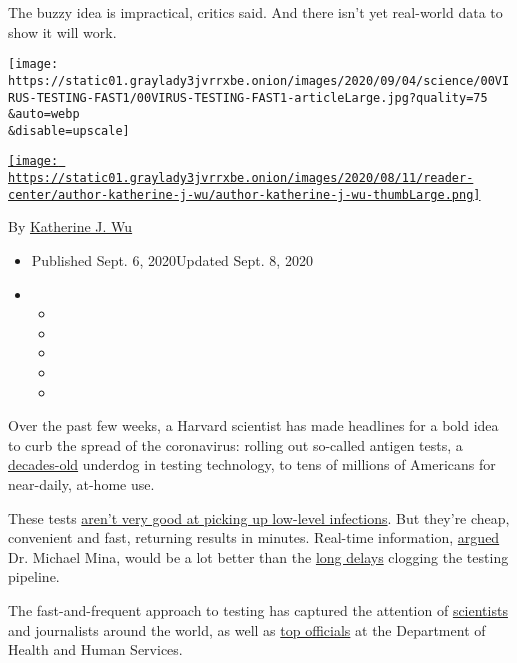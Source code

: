 The buzzy idea is impractical, critics said. And there isn't yet
real-world data to show it will work.

\texttt{[image: https://static01.graylady3jvrrxbe.onion/images/2020/09/04/science/00VIRUS-TESTING-FAST1/00VIRUS-TESTING-FAST1-articleLarge.jpg?quality=75\\\&auto=webp\\\&disable=upscale]}

\href{https://www.nytimes3xbfgragh.onion/by/katherine-j--wu}{\texttt{[image: https://static01.graylady3jvrrxbe.onion/images/2020/08/11/reader-center/author-katherine-j-wu/author-katherine-j-wu-thumbLarge.png]}}

By
\href{https://www.nytimes3xbfgragh.onion/by/katherine-j--wu}{Katherine
J. Wu}

\begin{itemize}
\item
  Published Sept. 6, 2020Updated Sept. 8, 2020
\item
  \begin{itemize}
  \item
  \item
  \item
  \item
  \item
  \end{itemize}
\end{itemize}

Over the past few weeks, a Harvard scientist has made headlines for a
bold idea to curb the spread of the coronavirus: rolling out so-called
antigen tests, a
\href{https://www.ncbi.nlm.nih.gov/pmc/articles/PMC7119943/}{decades-old}
underdog in testing technology, to tens of millions of Americans for
near-daily, at-home use.

These tests
\href{https://www.nytimes3xbfgragh.onion/2020/08/06/health/rapid-Covid-tests.html}{aren't
very good at picking up low-level infections}. But they're cheap,
convenient and fast, returning results in minutes. Real-time
information,
\href{https://www.nytimes3xbfgragh.onion/2020/07/03/opinion/coronavirus-tests.html}{argued}
Dr. Michael Mina, would be a lot better than the
\href{https://www.nytimes3xbfgragh.onion/2020/07/23/health/coronavirus-testing-supply-shortage.html}{long
delays} clogging the testing pipeline.

The fast-and-frequent approach to testing has captured the attention of
\href{https://www.microbe.tv/twiv/twiv-640/}{scientists} and journalists
around the world, as well as
\href{https://twitter.com/HHS_ASH/status/1300146630201610240}{top
officials} at the Department of Health and Human Services.


